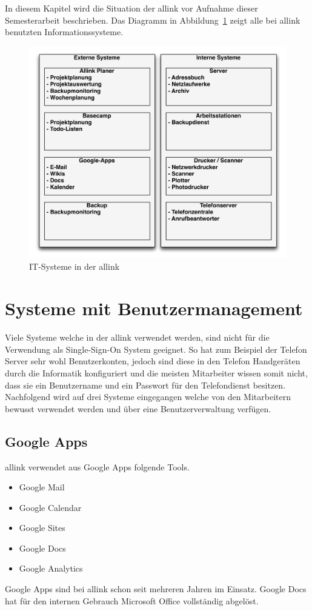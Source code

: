In diesem Kapitel wird die Situation der allink vor Aufnahme dieser Semesterarbeit beschrieben. Das Diagramm in Abbildung~\ref{fig:systemlandschaft} zeigt alle bei allink benutzten Informationssysteme.
\begin{figure}[h]
  \centering
	\includegraphics[width=1\textwidth]{include/systemlandschaft.pdf}
	\caption{IT-Systeme in der allink}
	\label{fig:systemlandschaft}
\end{figure}


\section{Systeme mit Benutzermanagement}
\label{sec:Systeme mit Benutzermanagement}
Viele Systeme welche in der allink verwendet werden, sind nicht für die Verwendung als Single-Sign-On System geeignet. So hat zum Beispiel der Telefon Server sehr wohl Benutzerkonten, jedoch sind diese in den Telefon Handgeräten durch die Informatik konfiguriert und die meisten Mitarbeiter wissen somit nicht, dass sie ein Benutzername und ein Passwort für den Telefondienst besitzen. Nachfolgend wird auf drei Systeme eingegangen welche von den Mitarbeitern bewusst verwendet werden und über eine Benutzerverwaltung verfügen.

\subsection{Google Apps}
\label{subs:Google_Apps}
allink verwendet aus Google Apps folgende Tools. 
\begin{itemize}
	\item Google Mail 
	\item Google Calendar 
	\item Google Sites 
	\item Google Docs 
	\item Google Analytics 
\end{itemize}
Google Apps sind bei allink schon seit mehreren Jahren im Einsatz. Google Docs hat für den internen Gebrauch Microsoft Office vollständig abgelöst.

